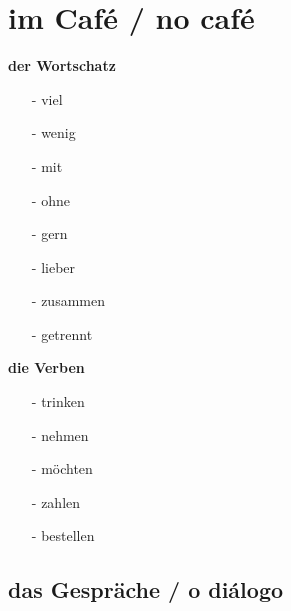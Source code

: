     \pagebreak\section{im Café / no café}\label{section:deutsch:im_cafe}
    
        \begin{multicols}{3}
            \textbf{der Wortschatz}
            \begin{itemize}[topsep=0pt,itemsep=4pt,parsep=0pt]
                \item[-] viel 
                \item[-] wenig 
                \item[-] mit 
                \item[-] ohne 
                \item[-] gern 
                \item[-] lieber 
                \item[-] zusammen 
                \item[-] getrennt  
            \end{itemize}
        \vfill\null
        \columnbreak
            \textbf{die Verben}
            \begin{itemize}[topsep=0pt,itemsep=4pt,parsep=0pt]
                \item[-] trinken 
                \item[-] nehmen 
                \item[-] möchten 
                \item[-] zahlen 
                \item[-] bestellen  
            \end{itemize}
        \vfill\null
        \end{multicols}

        \subsection{das Gespräche / o diálogo}\label{subsection:deutsch:im_cafe:das_gesprache}

